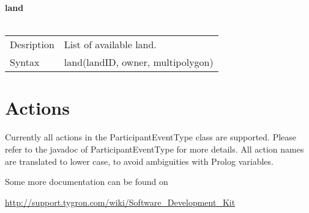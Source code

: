 \documentclass[english,11pt]{article}
\begin{document}
\textbf{land}\\
\\
\begin{tabularx}{\textwidth}{lX}
 Desription & List of available land. \\
 Syntax & land(landID, owner, multipolygon) \\
\end{tabularx}
\newline



\section{Actions}

Currently all actions in the ParticipantEventType class are supported. Please refer to the javadoc of ParticipantEventType for more details. All action names are translated to lower case, to avoid ambiguities with Prolog variables.

Some more documentation can be found on

\url{http://support.tygron.com/wiki/Software_Development_Kit}
\end{document}

